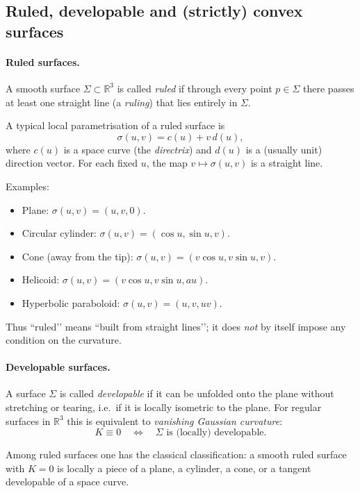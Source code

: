 \documentclass[12pt,a4paper]{article}
\theoremstyle{plain}
\theoremstyle{definition}      %
\begin{document}
	
	\subsection*{Ruled, developable and (strictly) convex surfaces}
	
	\paragraph{Ruled surfaces.}
	A smooth surface $\Sigma\subset\mathbb{R}^3$ is called \emph{ruled} if through
	every point $p\in\Sigma$ there passes at least one straight line (a
	\emph{ruling}) that lies entirely in $\Sigma$.
	
	A typical local parametrisation of a ruled surface is
	\[
	\sigma(u,v)=c(u)+v\,d(u),
	\]
	where $c(u)$ is a space curve (the \emph{directrix}) and $d(u)$ is a (usually
	unit) direction vector.  For each fixed $u$, the map $v\mapsto\sigma(u,v)$ is a
	straight line.
	
	Examples:
	\begin{itemize}
		\item Plane: $\sigma(u,v)=(u,v,0)$.
		\item Circular cylinder: $\sigma(u,v)=(\cos u,\sin u,v)$.
		\item Cone (away from the tip): $\sigma(u,v)=(v\cos u,v\sin u,v)$.
		\item Helicoid: $\sigma(u,v)=(v\cos u,v\sin u,au)$.
		\item Hyperbolic paraboloid: $\sigma(u,v)=(u,v,uv)$.
	\end{itemize}
	Thus “ruled’’ means “built from straight lines’’; it does \emph{not} by itself
	impose any condition on the curvature.
	
	\bigskip
	\paragraph{Developable surfaces.}
	A surface $\Sigma$ is called \emph{developable} if it can be unfolded onto the
	plane without stretching or tearing, i.e.\ if it is locally isometric to the
	plane.  For regular surfaces in $\mathbb{R}^3$ this is equivalent to
	\emph{vanishing Gaussian curvature}:
	\[
	K\equiv 0 \quad\Longleftrightarrow\quad
	\text{$\Sigma$ is (locally) developable}.
	\]
	
	Among ruled surfaces one has the classical classification: a smooth ruled
	surface with $K=0$ is locally a piece of a plane, a cylinder, a cone, or a
	tangent developable of a space curve.
	
\end{document}
